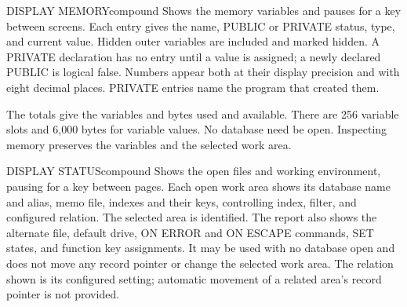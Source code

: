 \begin{XbaseEntry}{DISPLAY MEMORY}{compound}
Shows the memory variables and pauses for a key between screens.
\Syntax
{}
\Usage
Each entry gives the name, PUBLIC or PRIVATE status, type, and current value.
Hidden outer variables are included and marked hidden.  A PRIVATE declaration
has no entry until a value is assigned; a newly declared PUBLIC is logical
false.  Numbers appear both at their display precision and with eight decimal
places.  PRIVATE entries name the program that created them.

The totals give the variables and bytes used and available.  There are 256
variable slots and 6,000 bytes for variable values.  No database need be open.
Inspecting memory preserves the variables and the selected work area.
\end{XbaseEntry}

\begin{XbaseEntry}{DISPLAY STATUS}{compound}
Shows the open files and working environment, pausing for a key between pages.
\Syntax
{}
\Usage
Each open work area shows its database name and alias, memo file, indexes and
their keys, controlling index, filter, and configured relation.  The selected
area is identified.  The report also shows the alternate file, default drive,
ON ERROR and ON ESCAPE commands, SET states, and function key assignments.
It may be used with no database open and does not move any record pointer or
change the selected work area.  The relation shown is its configured setting;
automatic movement of a related area's record pointer is not provided.
\end{XbaseEntry}

